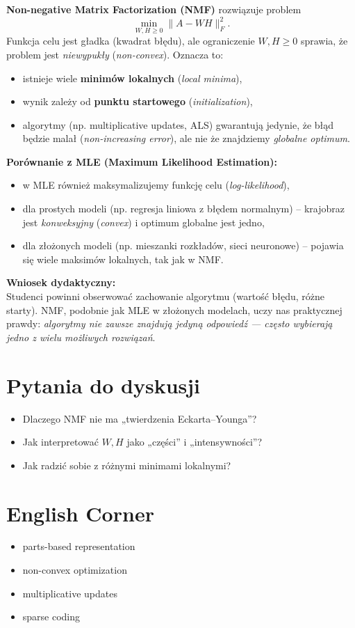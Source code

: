 \documentclass[12pt]{article}
\begin{document}
\noindent
\textbf{Non-negative Matrix Factorization (NMF)} rozwiązuje problem
\[
\min_{W,H \ge 0} \|A - WH\|_F^2.
\]
Funkcja celu jest gładka (kwadrat błędu), ale ograniczenie $W,H \ge 0$ sprawia,
że problem jest \emph{niewypukły} (\emph{non-convex}).
Oznacza to:
\begin{itemize}
  \item istnieje wiele \textbf{minimów lokalnych} (\emph{local minima}),
  \item wynik zależy od \textbf{punktu startowego} (\emph{initialization}),
  \item algorytmy (np. multiplicative updates, ALS) gwarantują jedynie, że
        błąd będzie malał (\emph{non-increasing error}),
        ale nie że znajdziemy \emph{globalne optimum}.
\end{itemize}

\medskip
\noindent
\textbf{Porównanie z MLE (Maximum Likelihood Estimation):}
\begin{itemize}
  \item w MLE również maksymalizujemy funkcję celu (\emph{log-likelihood}),
  \item dla prostych modeli (np. regresja liniowa z błędem normalnym) –
        krajobraz jest \emph{konweksyjny} (\emph{convex}) i optimum globalne jest jedno,
  \item dla złożonych modeli (np. mieszanki rozkładów, sieci neuronowe) –
        pojawia się wiele maksimów lokalnych, tak jak w NMF.
\end{itemize}

\medskip
\noindent
\textbf{Wniosek dydaktyczny:} \\
Studenci powinni obserwować zachowanie algorytmu (wartość błędu, różne starty).
NMF, podobnie jak MLE w złożonych modelach, uczy nas praktycznej prawdy:
\emph{algorytmy nie zawsze znajdują jedyną odpowiedź — często wybierają jedno z wielu możliwych rozwiązań}.
\medskip

\begin{center}
\end{center}


\section*{Pytania do dyskusji}
\begin{itemize}
  \item Dlaczego NMF nie ma „twierdzenia Eckarta--Younga”?
  \item Jak interpretować $W,H$ jako „części” i „intensywności”?
  \item Jak radzić sobie z różnymi minimami lokalnymi?
\end{itemize}

\section*{English Corner}
\begin{itemize}
  \item parts-based representation
  \item non-convex optimization
  \item multiplicative updates
  \item sparse coding
\end{itemize}
\end{document}
